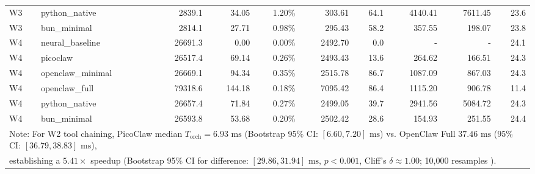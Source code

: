 \begin{table}[t]
\begin{tabular}{llrrrrrrrr}
W3 & python\_native & 2839.1 & 34.05 & 1.20\% & 303.61 & 64.1 & 4140.41 & 7611.45 & 23.6 \\
W3 & bun\_minimal & 2814.1 & 27.71 & 0.98\% & 295.43 & 58.2 & 357.55 & 198.07 & 23.8 \\
\midrule
W4 & neural\_baseline & 26691.3 & 0.00 & 0.00\% & 2492.70 & 0.0 & - & - & 24.1 \\
W4 & picoclaw & 26517.4 & 69.14 & 0.26\% & 2493.43 & 13.6 & 264.62 & 166.51 & 24.3 \\
W4 & openclaw\_minimal & 26669.1 & 94.34 & 0.35\% & 2515.78 & 86.7 & 1087.09 & 867.03 & 24.3 \\
W4 & openclaw\_full & 79318.6 & 144.18 & 0.18\% & 7095.42 & 86.4 & 1115.20 & 906.78 & 11.4 \\
W4 & python\_native & 26657.4 & 71.84 & 0.27\% & 2499.05 & 39.7 & 2941.56 & 5084.72 & 24.3 \\
W4 & bun\_minimal & 26593.8 & 53.68 & 0.20\% & 2502.42 & 28.6 & 154.93 & 251.55 & 24.4 \\
\midrule
\multicolumn{10}{l}{\footnotesize Note: For W2 tool chaining, PicoClaw median $T_{\text{orch}} = 6.93\text{ ms}$ (Bootstrap 95\% CI: $[6.60, 7.20]\text{ ms}$) vs. OpenClaw Full $37.46\text{ ms}$ (95\% CI: $[36.79, 38.83]\text{ ms}$),} \\
\multicolumn{10}{l}{\footnotesize establishing a $5.41\times$ speedup (Bootstrap 95\% CI for difference: $[29.86, 31.94]\text{ ms}$, $p < 0.001$, Cliff's $\delta \approx 1.00$; 10,000 resamples \cite{efron1979}).} \\
\bottomrule
\end{tabular}
\end{table}
